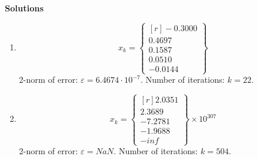 \documentclass[12pt]{article}
\begin{document}
\begin{description}
    \ifsolution
    \color{red}
    {\bf Solutions}
    \begin{enumerate} [label=(\alph*)]
    \item
    \begin{equation*}
        x_k = \begin{Bmatrix*}[r] -0.3000\\ 0.4697\\ 0.1587\\ 0.0510\\ -0.0144\end{Bmatrix*}
    \end{equation*}
    2-norm of error: $\varepsilon = 6.4674 \cdot 10^{-7}$. Number of iterations: $k = 22$.\\
    \item
    \begin{equation*}
        x_k = \begin{Bmatrix*}[r] 2.0351\\ 2.3689\\ -7.2781\\ -1.9688\\ -inf\end{Bmatrix*}\times 10^{307}
    \end{equation*}
    2-norm of error: $\varepsilon = NaN $. Number of iterations: $k = 504$.
    \end{enumerate}
    \color{black}
    \fi

\end{description}
\end{document}
